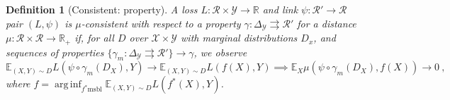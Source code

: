 \documentclass{article}
\newcommand{\Comments}{1}
\newcommand{\mynote}[2]{\ifnum\Comments=1\textcolor{#1}{#2}\fi}
\newcommand{\raf}[1]{\mynote{green}{[RF: #1]}}
\newcommand{\reals}{\mathbb{R}}
\newcommand{\simplex}{\Delta_\Y}
\newcommand{\E}{\mathbb{E}}
\newcommand{\R}{\mathcal{R}}
\newcommand{\X}{\mathcal{X}}
\newcommand{\Y}{\mathcal{Y}}
\newcommand{\toto}{\rightrightarrows}
\newtheorem{definition}{Definition}
\DeclareMathOperator*{\arginf}{arg\,inf}
\begin{document}
\begin{definition}[Consistent: property]
	A loss $L : \R \times \Y \to \reals$ and link $\psi : \R' \to \R$ pair $(L, \psi)$ is \emph{$\mu$-consistent with respect to a property} $\gamma: \simplex \toto \R'$ for a distance $\mu:\R \times \R \to \reals_+$ if, for all $D$ over $\X \times \Y$ with marginal distributions $D_x$, and sequences of properties $\{\gamma_m: \simplex \toto \R'\} \to \gamma$, we observe
	\begin{equation}
	\E_{(X,Y) \sim D} L( \psi \circ \gamma_m(D_X), Y) \to \E_{(X,Y) \sim D} L(f(X), Y) \implies \E_X \mu(\psi \circ \gamma_m(D_X), f(X)) \to 0~,~
	\end{equation}
	where $f = \arginf_{f^* \mathrm{msbl}} \E_{(X,Y) \sim D} L(f^*(X), Y)$.
\end{definition}


\end{document}
